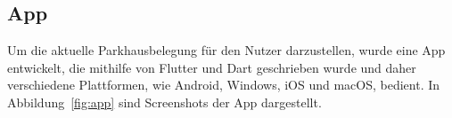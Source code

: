 \subsection{App}\label{ch:Umsetzung_App}

Um die aktuelle Parkhausbelegung für den Nutzer darzustellen, wurde eine App entwickelt, die mithilfe von Flutter und Dart geschrieben wurde und daher verschiedene Plattformen, wie Android, Windows, iOS und macOS, bedient.
In Abbildung~\ref{fig:app} sind Screenshots der App dargestellt.

\begin{figure}[h]
	\centering

\end{figure}
